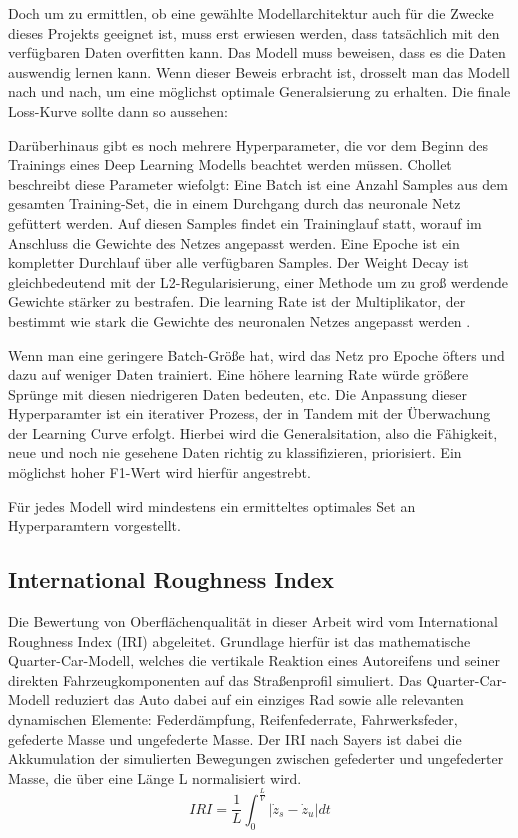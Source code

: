 Doch um zu ermittlen, ob eine gewählte Modellarchitektur auch für die Zwecke dieses Projekts geeignet ist, muss erst erwiesen werden, dass tatsächlich mit den verfügbaren Daten overfitten kann. Das Modell muss beweisen, dass es die Daten auswendig lernen kann. Wenn dieser Beweis erbracht ist, drosselt man das Modell nach und nach, um eine möglichst optimale Generalsierung zu erhalten. Die finale Loss-Kurve sollte dann so aussehen: \cite{Chollet2025}

Darüberhinaus gibt es noch mehrere Hyperparameter, die vor dem Beginn des Trainings eines Deep Learning Modells beachtet werden müssen. Chollet beschreibt diese Parameter wiefolgt: Eine Batch ist eine Anzahl Samples aus dem gesamten Training-Set, die in einem Durchgang durch das neuronale Netz gefüttert werden. Auf diesen Samples findet ein Traininglauf statt, worauf im Anschluss die Gewichte des Netzes angepasst werden. Eine Epoche ist ein kompletter Durchlauf über alle verfügbaren Samples. Der Weight Decay ist gleichbedeutend mit der L2-Regularisierung, einer Methode um zu groß werdende Gewichte stärker zu bestrafen. Die learning Rate ist der Multiplikator, der bestimmt wie stark die Gewichte des neuronalen Netzes angepasst werden \cite{Chollet2025}.

Wenn man eine geringere Batch-Größe hat, wird das Netz pro Epoche öfters und dazu auf weniger Daten trainiert. Eine höhere learning Rate würde größere Sprünge mit diesen niedrigeren Daten bedeuten, etc. Die Anpassung dieser Hyperparamter ist ein iterativer Prozess, der in Tandem mit der Überwachung der Learning Curve erfolgt. Hierbei wird die Generalsitation, also die Fähigkeit, neue und noch nie gesehene Daten richtig zu klassifizieren, priorisiert. Ein möglichst hoher F1-Wert wird hierfür angestrebt.

Für jedes Modell wird mindestens ein ermitteltes optimales Set an Hyperparamtern vorgestellt.


\subsection{International Roughness Index}
Die Bewertung von Oberflächenqualität in dieser Arbeit wird vom International Roughness Index (IRI) abgeleitet. Grundlage hierfür ist das mathematische Quarter-Car-Modell, welches die vertikale Reaktion eines Autoreifens und seiner direkten Fahrzeugkomponenten auf das Straßenprofil simuliert. Das Quarter-Car-Modell reduziert das Auto dabei auf ein einziges Rad sowie alle relevanten dynamischen Elemente: Federdämpfung, Reifenfederrate, Fahrwerksfeder, gefederte Masse und ungefederte Masse. Der IRI nach Sayers ist dabei die Akkumulation der simulierten Bewegungen zwischen gefederter und ungefederter Masse, die über eine Länge L normalisiert wird. \cite{Sayers1995}
\begin{equation}
    IRI = \frac{1}{L} \int_{0}^{\frac{L}{V}} \left| \dot{z}_s - \dot{z}_u \right| dt
    \label{eq:iri_sayers}
\end{equation}

